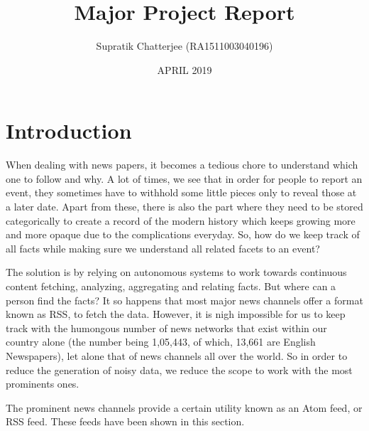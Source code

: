\documentclass{srmreport}
\title{Major Project Report}
\author{Supratik Chatterjee (RA1511003040196)}
\date{APRIL 2019}
\begin{document}
\maketitle
\setlength{\columnsep}{10pt}
\chapter{Introduction}
When dealing with news papers, it becomes a tedious chore to understand which one to follow and why. A lot of times, we see that in order for people to report an event, they sometimes have to withhold some little pieces only to reveal those at a later date. Apart from these, there is also the part where  they need to be stored categorically to create a record of the modern history which keeps growing more and more opaque due to the complications everyday. So, how do we keep track of all facts while making sure we understand all related facets to an event?
\par The solution is by relying on autonomous systems to work towards continuous content fetching, analyzing, aggregating and relating facts. But where can a person find the facts? It so happens that most major news channels offer a format known as RSS, to fetch the data. However, it is nigh impossible for us to keep track with the humongous number of news networks that exist within our country alone (the number being 1,05,443, of which, 13,661 are English Newspapers), let alone that of news channels all over the world. So in order to reduce the generation of noisy data, we reduce the scope to work with the most prominents ones.
\par The prominent news channels provide a certain utility known as an Atom feed, or RSS feed. These feeds have been shown in this section. 
\end{document}
